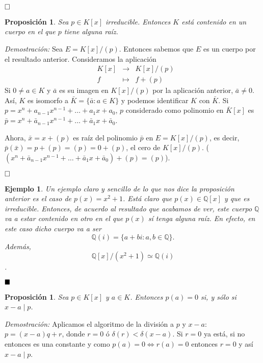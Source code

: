 \documentclass[12pt]{article}
\newtheorem{proposition}[theorem]{Proposición}
\newtheorem{example}{Ejemplo}[theorem]
\begin{document}
$\hfill \square$

\begin{proposition}\label{eq:ac1} Sea $p \in K[x]$ irreducible. Entonces $K$ está contenido en un cuerpo en el que $p$ tiene alguna raíz.
\end{proposition}
\emph{Demostración: } Sea $E = K[x]/(p)$. Entonces sabemos que $E$ es un cuerpo por el resultado anterior. Consideramos la aplicación $$\begin{array}{rccl}
&K[x]&\longrightarrow &K[x]/(p) \\
&f& \longmapsto &f+(p)
\end{array}
$$
Si $0 \neq a \in K$ y $\bar{a}$ es su imagen en $K[x]/(p)$ por la aplicación anterior, $\bar{a} \neq 0$. Así, $K$ es isomorfo a $\bar{K} = \lbrace \bar{a}: a \in K \rbrace$ y podemos identificar $K$ con $\bar{K}$. Si $p = x^{n} + a_{n-1}x^{n-1} + \ldots + a_{1}x + a_{0}$, $p$ considerado como polinomio en $\bar{K}[x]$ es $\bar{p} = x^{n}+ \bar{a}_{n-1}x^{n-1}+ \ldots + \bar{a}_{1}x + \bar{a}_{0}$.

Ahora, $\bar{x} = x +(p)$ es raíz del polinomio $\bar{p}$ en $E= K[x]/(p)$, es decir, $\bar{p}(\bar{x}) = p+(p) = (p) = 0 +(p)$, el cero de $K[x]/(p)$. ($(x^{n}+ \bar{a}_{n-1}x^{n-1}+ \ldots + \bar{a}_{1}x + \bar{a}_{0}) + (p) = (p)$).

$\hfill \square$

\begin{example} Un ejemplo claro y sencillo de lo que nos dice la proposición anterior es el caso de $p(x) = x^{2}+1$. Está claro que $p(x) \in \mathbb{Q}[x]$ y que es irreducible. Entonces, de acuerdo al resultado que acabamos de ver, este cuerpo $\mathbb{Q}$ va a estar contenido en otro en el que $p(x)$ sí tenga alguna raíz. En efecto, en este caso dicho cuerpo va a ser $$\mathbb{Q}(i) = \lbrace a + bi :a,b \in \mathbb{Q} \rbrace.$$ Además, $$\mathbb{Q}[x]/(x^{2}+1) \simeq \mathbb{Q}(i)$$.
\end{example}

$\hfill \blacksquare$

\begin{proposition}\label{eq:ac2} Sea $p \in K[x]$ y $a \in K$. Entonces $p(a) = 0$ si, y sólo si $x-a \mid p$.
\end{proposition}
\emph{Demostración: } Aplicamos el algoritmo de la división a $p$ y $x-a$: $p=(x-a)q + r$, donde $r = 0$ ó $\delta(r) < \delta(x-a)$. Si $r= 0$ ya está, si no entonces es una constante y como $p(a) = 0 \Leftrightarrow r(a)= 0$ entonces $r = 0$ y así $x-a \mid p$.
\end{document}
